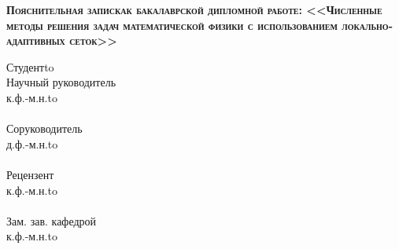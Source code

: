 \begin{titlepage}
    \newpage
    
    \vspace{3em} %
    
   
    \begin{center}
        \textsc{ \textbf{Пояснительная записка\linebreak к бакалаврской дипломной работе: \linebreak  \Large <<Численные методы решения задач математической физики с использованием локально-адаптивных сеток>>}}
    \end{center} 

    
    \vspace{5em}
    
   
    \newbox{\lbox}
    
    \setlength{\maxl}{\wd\lbox}
    \hfill\parbox{12cm}{
    \hspace*{1cm}\hspace*{-1cm}Студент\hfill\hbox to\\
    
    \hspace*{1cm}\hspace*{-1cm}Научный руководитель\hfill\\
    \hspace*{1cm}\hspace*{-1cm}к.ф.-м.н.\hfill\hbox to\\ \\
    \hspace*{1cm}\hspace*{-1cm}Соруководитель\hfill\\
    \hspace*{1cm}\hspace*{-1cm}д.ф.-м.н.\hfill\hbox to\\ \\
    \hspace*{1cm}\hspace*{-1cm}Рецензент\hfill\\
    \hspace*{1cm}\hspace*{-1cm}к.ф.-м.н.\hfill\hbox to\\ \\ 
    \hspace*{1cm}\hspace*{-1cm}Зам. зав. кафедрой \hfill\\
    \hspace*{1cm}\hspace*{-1cm}к.ф.-м.н.\hfill\hbox to\\ \\ 
    
    }
    
   
    
    


\end{titlepage}

